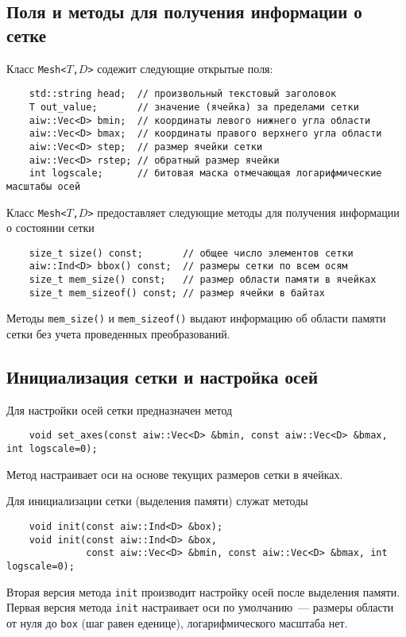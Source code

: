 \subsection{Поля и методы для получения информации о сетке}
Класс {\tt Mesh<$T$,$D$>} содежит следующие открытые поля:
\begin{verbatim}
    std::string head;  // произвольный текстовый заголовок
    T out_value;       // значение (ячейка) за пределами сетки
    aiw::Vec<D> bmin;  // координаты левого нижнего угла области
    aiw::Vec<D> bmax;  // координаты правого верхнего угла области
    aiw::Vec<D> step;  // размер ячейки сетки
    aiw::Vec<D> rstep; // обратный размер ячейки
    int logscale;      // битовая маска отмечающая логарифмические масштабы осей
\end{verbatim}

Класс {\tt Mesh<$T$,$D$>} предоставляет следующие методы для получения информации о состоянии сетки
\begin{verbatim}
    size_t size() const;       // общее число элементов сетки
    aiw::Ind<D> bbox() const;  // размеры сетки по всем осям
    size_t mem_size() const;   // размер области памяти в ячейках
    size_t mem_sizeof() const; // размер ячейки в байтах
\end{verbatim}
Методы \verb'mem_size()' и \verb'mem_sizeof()' выдают информацию об области памяти сетки без учета
проведенных преобразований. 

\subsection{Инициализация сетки и настройка осей}
Для настройки осей сетки предназначен метод
\begin{verbatim}
    void set_axes(const aiw::Vec<D> &bmin, const aiw::Vec<D> &bmax, int logscale=0);
\end{verbatim}
Метод настраивает оси на основе текущих размеров сетки в ячейках.

Для инициализации сетки (выделения памяти) служат методы 
\begin{verbatim}
    void init(const aiw::Ind<D> &box);
    void init(const aiw::Ind<D> &box, 
              const aiw::Vec<D> &bmin, const aiw::Vec<D> &bmax, int logscale=0);
\end{verbatim}
Вторая версия метода \verb'init' производит настройку осей после выделения памяти.
Первая версия метода \verb'init' настраивает оси по умолчанию~--- размеры области от нуля до \verb'box' 
(шаг равен еденице), логарифмического масштаба нет.

